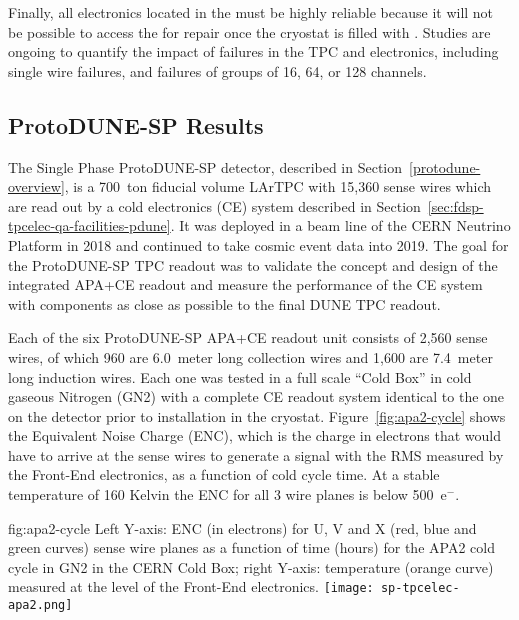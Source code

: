 Finally, all electronics located in the \lar must 
be highly reliable because it will not be possible to access the  for repair once the cryostat is filled with \lar. Studies are ongoing to quantify the impact of failures in the TPC and electronics, including single wire failures, and failures of groups of \num{16}, \num{64}, or \num{128} channels.

\subsection{ProtoDUNE-SP Results}
\label{sec:fdsp-tpcelec-overview-pdune}

The Single Phase ProtoDUNE-SP detector, described in Section~\ref{protodune-overview}, is a 700~ton fiducial volume LArTPC with 15,360 sense wires which are read out by a cold electronics (CE) system described in Section~\ref{sec:fdsp-tpcelec-qa-facilities-pdune}. It was deployed in a beam line of the CERN Neutrino Platform in 2018 and continued to take cosmic event data into 2019. The goal for the ProtoDUNE-SP TPC readout was to validate the concept and design of the integrated APA+CE readout and measure the performance of the CE system with components as close as possible to the final DUNE TPC readout.

Each of the six ProtoDUNE-SP APA+CE readout unit consists of 2,560 sense wires, of which 960 are 6.0~meter long collection wires and 1,600 are 7.4~meter long induction wires. Each one was tested in a full scale ``Cold Box'' in cold gaseous Nitrogen (GN2) with a complete CE readout system identical to the one on the detector prior to installation in the cryostat. Figure~\ref{fig:apa2-cycle} shows the Equivalent Noise Charge (ENC), which is the charge in electrons that would have to arrive at the sense wires to generate a signal with the RMS measured by the Front-End electronics, as a function of cold cycle time. At a stable temperature of 160 Kelvin the ENC for all 3 wire planes is below 500~e$^-$.

\begin{dunefigure}
{fig:apa2-cycle}
{Left Y-axis: ENC (in electrons) for U, V and X (red, blue and green curves) sense wire planes as a function of time (hours) for the APA2 cold cycle in GN2 in the CERN Cold Box; right Y-axis: temperature (orange curve) measured at the level of the Front-End electronics.}
\texttt{[image: sp-tpcelec-apa2.png]}
\end{dunefigure}

